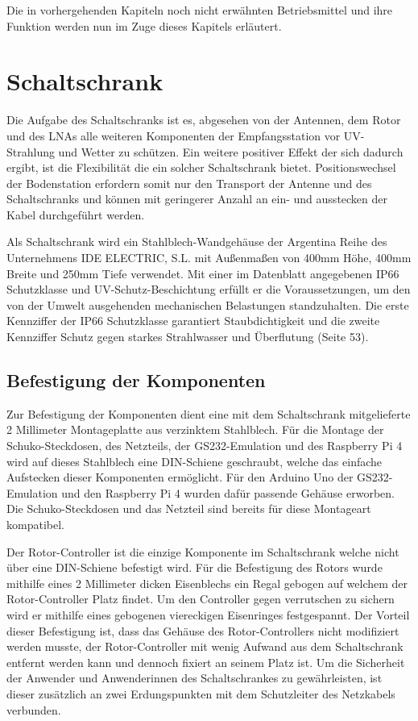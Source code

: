 Die in vorhergehenden Kapiteln noch nicht erwähnten Betriebsmittel und ihre Funktion werden nun im Zuge dieses Kapitels erläutert. 

\section{Schaltschrank}
\label{sec:Schaltschrank}
Die Aufgabe des Schaltschranks ist es, abgesehen von der Antennen, dem Rotor und des LNAs alle weiteren Komponenten der Empfangsstation vor UV-Strahlung und Wetter zu schützen. Ein weitere positiver Effekt der sich dadurch ergibt, ist die Flexibilität die ein solcher Schaltschrank bietet. Positionswechsel der Bodenstation erfordern somit nur den Transport der Antenne und des Schaltschranks und können mit geringerer Anzahl an ein- und ausstecken der Kabel durchgeführt werden.

Als Schaltschrank wird ein Stahlblech-Wandgehäuse der Argentina Reihe des Unternehmens IDE ELECTRIC, S.L. mit Außenmaßen von 400mm Höhe, 400mm Breite und 250mm Tiefe verwendet. Mit einer im Datenblatt \cite{ide_electric_sl_datenblatt_nodate} angegebenen IP66 Schutzklasse und UV-Schutz-Beschichtung erfüllt er die Voraussetzungen, um den von der Umwelt ausgehenden mechanischen Belastungen standzuhalten. Die erste Kennziffer der IP66 Schutzklasse garantiert Staubdichtigkeit und die zweite Kennziffer Schutz gegen starkes Strahlwasser und Überflutung \cite{lienig_elektronische_2014} (Seite 53).

\subsection{Befestigung der Komponenten}
Zur Befestigung der Komponenten dient eine mit dem Schaltschrank mitgelieferte 2 Millimeter Montageplatte aus verzinktem Stahlblech. Für die Montage der Schuko-Steckdosen, des Netzteils, der GS232-Emulation und des Raspberry Pi 4 wird auf dieses Stahlblech eine DIN-Schiene geschraubt, welche das einfache Aufstecken dieser Komponenten ermöglicht. Für den Arduino Uno der GS232-Emulation und den Raspberry Pi 4 wurden dafür passende Gehäuse erworben. Die Schuko-Steckdosen und das Netzteil sind bereits für diese Montageart kompatibel. 

Der Rotor-Controller ist die einzige Komponente im Schaltschrank welche nicht über eine DIN-Schiene befestigt wird. Für die Befestigung des Rotors wurde mithilfe eines 2 Millimeter dicken Eisenblechs ein Regal gebogen auf welchem der Rotor-Controller Platz findet. Um den Controller gegen verrutschen zu sichern wird er mithilfe eines gebogenen viereckigen Eisenringes festgespannt. Der Vorteil dieser Befestigung ist, dass das Gehäuse des Rotor-Controllers nicht modifiziert werden musste, der Rotor-Controller mit wenig Aufwand aus dem Schaltschrank entfernt werden kann und dennoch fixiert an seinem Platz ist. Um die Sicherheit der Anwender und Anwenderinnen des Schaltschrankes zu gewährleisten, ist dieser zusätzlich an zwei Erdungspunkten mit dem Schutzleiter des Netzkabels verbunden.

